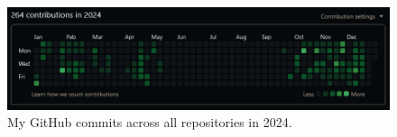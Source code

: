 \documentclass[12pt]{report}
\begin{document}
\begin{figure}[H]
    \centering
    \includegraphics[width=\linewidth]{GithubCommits.png}
    \caption{My GitHub commits across all repositories in 2024.}
    \label{fig:GithubCommitOverview}
\end{figure}







\printbibliography
\end{document}

